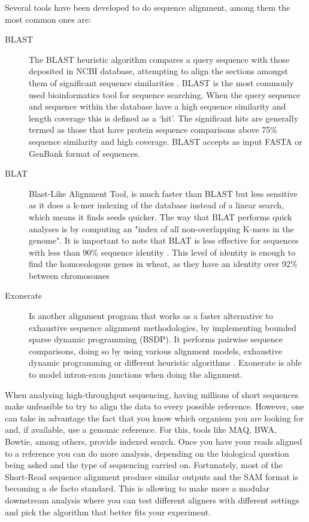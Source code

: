 Several tools have been developed to do sequence alignment, among them the most common ones are:

\begin{description}
\item[BLAST] The BLAST heuristic algorithm compares a query sequence with those deposited in NCBI database, attempting to align the sections amongst them of significant sequence similarities \citep{Altschul1990}. BLAST is the most commonly used bioinformatics tool for sequence searching. When the query sequence and sequence within the database have a high sequence similarity and length coverage this is defined as a ‘hit’. The significant hits are generally termed as those that have protein sequence comparisons above 75\% sequence similarity and high coverage. BLAST accepts as input FASTA  or GenBank format of sequences.
\item[BLAT] Blast-Like Alignment Tool, is much faster than BLAST but less sensitive as it does a k-mer indexing of the database instead of a linear search, which means it finds seeds quicker. The way that BLAT performs quick analyses is by computing an "index of all non-overlapping K-mers in the genome". It is important to note that BLAT is less effective for sequences with less than 90\% sequence identity \citep{Kent2002}. This level of identity is enough to find the homoeologous genes in wheat, as they have an identity over 92\% between chromosomes \citep{Krasileva2013}
\item[Exonerate] Is another alignment program that works as a faster alternative to exhaustive sequence alignment methodologies, by implementing bounded sparse dynamic programming (BSDP).  It performs pairwise sequence comparisons, doing so by using various alignment models, exhaustive dynamic programming or different heuristic algorithms \citep{Slater2005}.  Exonerate is able to model intron-exon junctions when doing the alignment. 
\end{description}


When analysing high-throughput sequencing, having millions of short sequences make unfeasible to try to align the data to every possible reference. However, one can take in advantage the fact that you know which organism you are looking for and, if available, use a genomic reference. For this, tools like MAQ, BWA, Bowtie, among others, provide indexed search.  Once you have your reads aligned to a reference you can do more analysis, depending on the biological question being asked and the type of sequencing carried on.  Fortunately, most of the Short-Read sequence alignment produce similar outputs and the SAM format is becoming a de facto standard. This is allowing to make more a modular downstream analysis where you can test different aligners with different settings and pick the algorithm that better fits your experiment\cite{Liu2012,Li2009,Li2009a}. 

